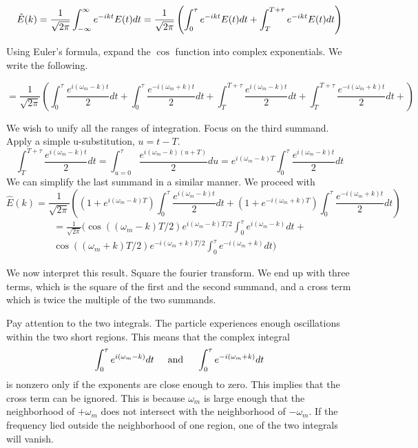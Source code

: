 \documentclass{article}
\newcommand{\textAnd}{
    {
        \hspace{5mm}
        \textrm{and}
        \hspace{5mm}
    }
}
\begin{document}
\[
    \hat E(k) = \frac 1 {\sqrt{2\pi}}
    \int_{-\infty}^{\infty} e^{-ikt} E(t) dt
    = \frac 1 {\sqrt{2\pi}}\left(
    \int_{0}^{\tau} e^{-ikt} E(t) dt + \int_{T}^{T + \tau} e^{-ikt} E(t) dt\right)
\]


\newcommand{\expterms}[3] {
\int_{#2}^{#3} \frac {e^{#1}} 2 dt
}


\newcommand{\dblexpterms}[3] {
\int_{#2}^{#3} {e^{#1}} dt
}



Using Euler's formula, expand the $\cos$ function into 
complex exponentials. We write the following. 

\[
    =
    \frac 1 {\sqrt {2\pi}}
    \left(
    \expterms{i(\omega_m - k) t}{0} {\tau} +
    \expterms{-i(\omega_m + k) t}{0} {\tau} +
    \expterms{i(\omega_m - k) t}{T} {T + \tau} +
    \expterms{-i(\omega_m + k) t}{T} {T +\tau} +
    \right)
\]

We wish to unify all the ranges of integration. Focus on 
the third summand. Apply a simple u-substitution, $u = t - T$. 
\[
    \expterms{i(\omega_m - k) t}{T}{T + \tau} = 
    \int_{u = 0}^{\tau} \frac {e^{i(\omega_m - k) (u + T)}} 2 du
    = e^{i(\omega_m - k)T} \expterms{i(\omega_m - k) t}{0}{\tau}
\]
We can simplify the last summand in a similar manner. We proceed with 
\[
    \hat E(k) = 
    \frac 1 {\sqrt{2\pi}} \left(
        (1 + e^{i(\omega_m - k)T})
         \expterms{i(\omega_m - k) t}{0} {\tau}
         + 
          (1 + e^{-i(\omega_m + k)T})
\expterms{-i(\omega_m + k) t}{0} {\tau} 
    \right)
\]
\begin{equation*}
    \begin{split}
    =\frac 1 {\sqrt{2\pi}}
    \bigg(
    \cos((\omega_m - k)T/2) e^{i(\omega_m - k)T/2}
    \dblexpterms{i(\omega_m - k)}{0}{\tau}
    +\\
    \cos((\omega_m + k)T/2) e^{-i(\omega_m + k)T/2}
    \dblexpterms{-i(\omega_m + k)}{0}{\tau}
    \bigg)
    \end{split}
\end{equation*}

We now interpret this result. Square 
the fourier transform. 
We end up with three terms, which is the square of 
the first and the second summand, and a cross term 
which is twice the multiple of the two summands. 

Pay attention to the two integrals. 
The particle experiences 
enough oscillations within the two short regions. This means 
that the complex integral 
\[
 \dblexpterms{i(\omega_m - k)}{0}{\tau}
 \textAnd 
\dblexpterms{-i(\omega_m + k)}{0}{\tau}
\]
is nonzero only if the exponents are close enough to zero. 
This implies that the cross term can be ignored. This is because 
$\omega_m$ is large enough that the neighborhood of 
$+\omega_m$ does not intersect with the neighborhood of $-\omega_m$. 
If the frequency lied outside the neighborhood of one region, one 
of the two integrals will vanish. 
\end{document}
